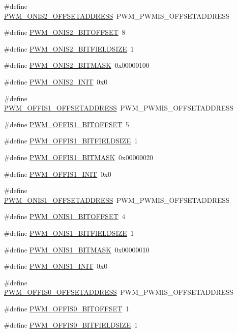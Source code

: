 \begin{DoxyCompactItemize}
\item 
\#define \hyperlink{a00565_ad85b1ea970d53706a654bf2e50752b67}{PWM\_\-ONIS2\_\-OFFSETADDRESS}~PWM\_\-PWMIS\_\-OFFSETADDRESS
\item 
\#define \hyperlink{a00565_a09ba755539781bfcafe8199bf842bbe3}{PWM\_\-ONIS2\_\-BITOFFSET}~8
\item 
\#define \hyperlink{a00565_aec621161c9287a2c020ec844e3e73692}{PWM\_\-ONIS2\_\-BITFIELDSIZE}~1
\item 
\#define \hyperlink{a00565_a1dcc9a8438a604cb0897b0ed9ad04917}{PWM\_\-ONIS2\_\-BITMASK}~0x00000100
\item 
\#define \hyperlink{a00565_aba7cb03e39fb0141b6a79a0f298a8e6d}{PWM\_\-ONIS2\_\-INIT}~0x0
\item 
\#define \hyperlink{a00565_abc1a93ef7b96e1697a76326f1847b0e4}{PWM\_\-OFFIS1\_\-OFFSETADDRESS}~PWM\_\-PWMIS\_\-OFFSETADDRESS
\item 
\#define \hyperlink{a00565_a29414f5c81a8ce89458d80e10677417b}{PWM\_\-OFFIS1\_\-BITOFFSET}~5
\item 
\#define \hyperlink{a00565_a8a83913942e9238413edbb1c9c4f6700}{PWM\_\-OFFIS1\_\-BITFIELDSIZE}~1
\item 
\#define \hyperlink{a00565_a2a75bc51e5dceab8d52b0273d5140b67}{PWM\_\-OFFIS1\_\-BITMASK}~0x00000020
\item 
\#define \hyperlink{a00565_ac51bb97b6d31f24dcb93d48016952447}{PWM\_\-OFFIS1\_\-INIT}~0x0
\item 
\#define \hyperlink{a00565_a64dafa81ad149352d3b96cdaf4df87ac}{PWM\_\-ONIS1\_\-OFFSETADDRESS}~PWM\_\-PWMIS\_\-OFFSETADDRESS
\item 
\#define \hyperlink{a00565_a30c2aa672bf574153e6aca0d0202dee7}{PWM\_\-ONIS1\_\-BITOFFSET}~4
\item 
\#define \hyperlink{a00565_a385174e318896f04ac28315523b32ef1}{PWM\_\-ONIS1\_\-BITFIELDSIZE}~1
\item 
\#define \hyperlink{a00565_a3a8368d37598a3e06ac0adbcbb45dce1}{PWM\_\-ONIS1\_\-BITMASK}~0x00000010
\item 
\#define \hyperlink{a00565_ab5bdc403d17f3c123eabba9ce9803144}{PWM\_\-ONIS1\_\-INIT}~0x0
\item 
\#define \hyperlink{a00565_ad776527b5c972a73cdb17fcfa7facf79}{PWM\_\-OFFIS0\_\-OFFSETADDRESS}~PWM\_\-PWMIS\_\-OFFSETADDRESS
\item 
\#define \hyperlink{a00565_a15a384ea0630b9925a7d363eeac6dde5}{PWM\_\-OFFIS0\_\-BITOFFSET}~1
\item 
\#define \hyperlink{a00565_a522485998071a566658c5e5053fd7a16}{PWM\_\-OFFIS0\_\-BITFIELDSIZE}~1

\end{DoxyCompactItemize}
